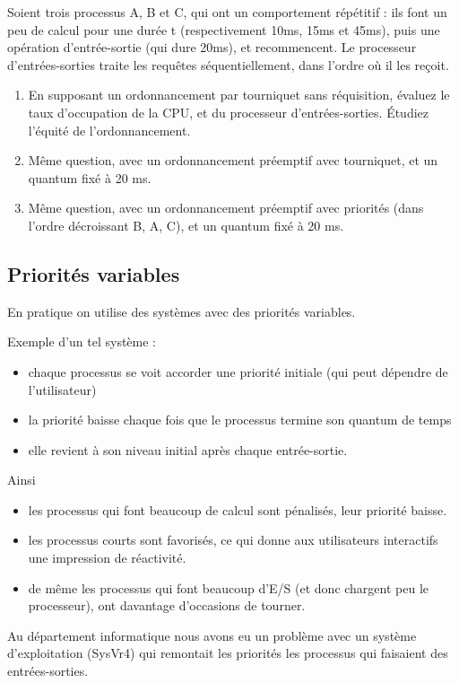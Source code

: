 \begin{multicols}{2}
\begin{exercice}
   Soient trois processus A, B et C, qui ont un comportement répétitif : ils font un peu de calcul
pour une durée t (respectivement 10ms, 15ms et 45ms), puis une opération d'entrée-sortie (qui
dure 20ms), et recommencent. Le processeur d'entrées-sorties traite les requêtes séquentiellement,
dans l'ordre où il les reçoit.
\begin{enumerate}
\item En supposant un ordonnancement par tourniquet sans réquisition,
  évaluez le taux d'occupation de la CPU, et du processeur
  d'entrées-sorties. Étudiez l'équité de l'ordonnancement.
\item 
  Même question, avec un ordonnancement préemptif avec tourniquet, et
  un quantum fixé à 20 ms.
\item Même question, avec un ordonnancement préemptif avec priorités
  (dans l'ordre décroissant B, A, C), et un quantum fixé à 20 ms.
\end{enumerate}
\end{exercice}

\subsection{Priorités variables}
En pratique on utilise des systèmes avec des priorités variables.

Exemple d'un tel système :
\begin{itemize}
\item chaque processus se voit accorder une priorité initiale (qui peut dépendre de l'utilisateur)
\item la priorité baisse chaque fois que le processus termine son quantum de temps 
\item elle revient à son niveau initial après chaque entrée-sortie.
\end{itemize}

Ainsi
\begin{itemize}
\item les processus qui font beaucoup de calcul sont pénalisés, leur priorité
baisse.
\item les processus courts sont favorisés, ce qui donne 
aux utilisateurs interactifs une impression de réactivité.
\item de même les processus qui font beaucoup d'E/S (et donc chargent
  peu le processeur), ont davantage d'occasions de tourner.
\end{itemize}

\begin{exercice}
Au département informatique nous avons eu un problème avec un système
d'exploitation (SysVr4) qui remontait les priorités les processus qui
faisaient des entrées-sorties.


\end{exercice}
\end{multicols}
